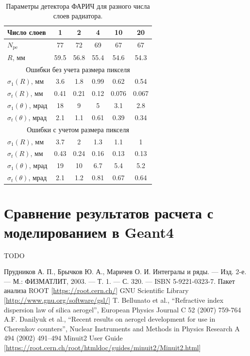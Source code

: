 \documentclass[12pt]{article}
\begin{document}
\begin{table}[htbp]
\caption{Параметры детектора ФАРИЧ для разного числа слоев радиатора.}
\label{tab:parlayers}
\begin{center}
\begin{tabular}{lccccc}\hline
Число слоев &  1 &  2 &  4 & 10 & 20\\\hline
$N_\mathrm{pe}$ &   77 &   72 &   69 &   67 &   67\\\hline
$R$, мм &  59.5 &  56.8 &  55.4 &  54.6 &  54.3\\\hline
\multicolumn{6}{c}{Ошибки без учета размера пикселя}\\\hline
$\sigma_1(R)$, мм &  3.6 &  1.8 & 0.99 & 0.62 & 0.54\\\hline
$\sigma_t(R)$, мм & 0.41 & 0.21 & 0.12 & 0.076 & 0.067\\\hline
$\sigma_1(\theta)$, мрад &   18 &    9 &    5 &  3.1 &  2.8\\\hline
$\sigma_t(\theta)$, мрад &  2.1 &  1.1 & 0.61 & 0.39 & 0.34\\\hline
\multicolumn{6}{c}{Ошибки с учетом размера пикселя}\\\hline
$\sigma_1(R)$, мм &  3.7 &    2 &  1.3 &  1.1 &    1\\\hline
$\sigma_t(R)$, мм & 0.43 & 0.24 & 0.16 & 0.13 & 0.13\\\hline
$\sigma_1(\theta)$, мрад &   19 &   10 &  6.7 &  5.4 &  5.2\\\hline
$\sigma_t(\theta)$, мрад &  2.1 &  1.2 & 0.81 & 0.67 & 0.64\\\hline
\end{tabular}
\end{center}
\end{table}


\section{Сравнение результатов расчета с моделированием в Geant4}
TODO

\begin{thebibliography}{99}
 Прудников А. П., Брычков Ю. А., Маричев О. И. Интегралы и ряды. — Изд. 2-е. — М.: ФИЗМАТЛИТ, 2003. — Т. 1. — С. 320. — ISBN 5-9221-0323-7.
 Пакет анализа ROOT [\url{https://root.cern.ch/}]
 GNU Scientific Library [\url{http://www.gnu.org/software/gsl/}]
 T. Bellunato et al., ``Refractive index dispersion law of silica aerogel'',
European Physics Journal C 52 (2007) 759-764
 A.F. Danilyuk et al., ``Recent results on aerogel development for use in Cherenkov counters'',
Nuclear Instruments and Methods in Physics Research A 494 (2002) 491–494
 Minuit2 User Guide [\url{https://root.cern.ch/root/htmldoc/guides/minuit2/Minuit2.html}]
\end{thebibliography}
\end{document}
